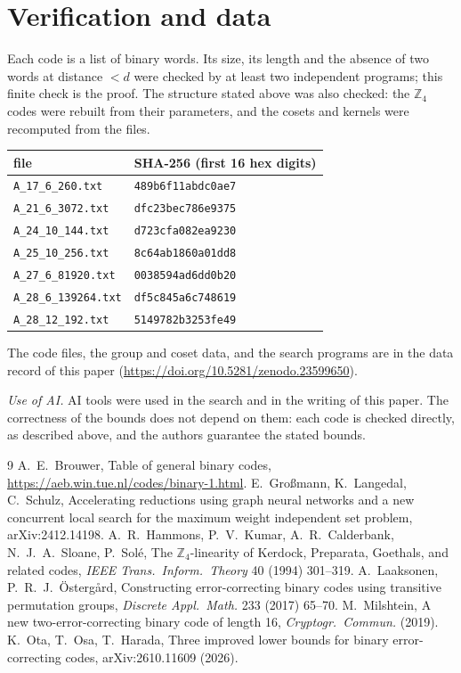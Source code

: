 \documentclass[11pt]{article}
\newcommand{\Z}{\mathbb{Z}_4}
\begin{document}
\section{Verification and data}

Each code is a list of binary words. Its size, its length and the absence of two words at distance $<d$ were checked by
at least two independent programs; this finite check is the proof. The structure stated above was also checked:
the $\Z$ codes were rebuilt from their parameters, and the cosets and kernels were recomputed from the files.

\begin{center}
\begin{tabular}{ll}
\toprule
file & SHA-256 (first 16 hex digits) \\
\midrule
\texttt{A\_17\_6\_260.txt} & \texttt{489b6f11abdc0ae7} \\
\texttt{A\_21\_6\_3072.txt} & \texttt{dfc23bec786e9375} \\
\texttt{A\_24\_10\_144.txt} & \texttt{d723cfa082ea9230} \\
\texttt{A\_25\_10\_256.txt} & \texttt{8c64ab1860a01dd8} \\
\texttt{A\_27\_6\_81920.txt} & \texttt{0038594ad6dd0b20} \\
\texttt{A\_28\_6\_139264.txt} & \texttt{df5c845a6c748619} \\
\texttt{A\_28\_12\_192.txt} & \texttt{5149782b3253fe49} \\
\bottomrule
\end{tabular}
\end{center}

The code files, the group and coset data, and the search programs are in the data record of this paper (\url{https://doi.org/10.5281/zenodo.23599650}).

\emph{Use of AI.} AI tools were used in the search and in the writing of this paper. The correctness of the
bounds does not depend on them: each code is checked directly, as described above, and the authors guarantee the
stated bounds.

\begin{thebibliography}{9}
 A.~E.~Brouwer, Table of general binary codes, \url{https://aeb.win.tue.nl/codes/binary-1.html}.
 E.~Gro{\ss}mann, K.~Langedal, C.~Schulz, Accelerating reductions using graph neural networks and a new
concurrent local search for the maximum weight independent set problem, arXiv:2412.14198.
 A.~R.~Hammons, P.~V.~Kumar, A.~R.~Calderbank, N.~J.~A.~Sloane, P.~Sol\'e, The $\mathbb{Z}_4$-linearity of
Kerdock, Preparata, Goethals, and related codes, \emph{IEEE Trans.\ Inform.\ Theory} 40 (1994) 301--319.
 A.~Laaksonen, P.~R.~J.~\"Osterg\aa rd, Constructing error-correcting binary codes using transitive
permutation groups, \emph{Discrete Appl.\ Math.} 233 (2017) 65--70.
 M.~Milshtein, A new two-error-correcting binary code of length 16, \emph{Cryptogr.\ Commun.} (2019).
 K.~Ota, T.~Osa, T.~Harada, Three improved lower bounds for binary error-correcting codes,
arXiv:2610.11609 (2026).
\end{thebibliography}
\end{document}
